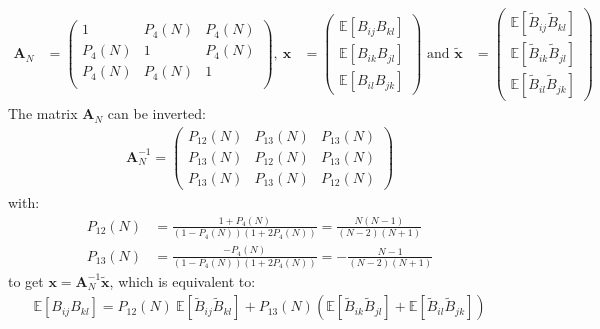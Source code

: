 \documentclass[12pt]{scrartcl}
\begin{document}
\begin{align}
\mathbf{A}_N & = \left( \begin{array}{ccc}
1 & P_4(N) & P_4(N) \\
P_4(N) & 1 & P_4(N) \\
P_4(N) & P_4(N) & 1 \\
\end{array} \right) , \ 
\mathbf{x} & = \left( \begin{array}{c}
\mathbb{E} \left[B_{ij} B_{kl}\right] \\
\mathbb{E} \left[B_{ik} B_{jl}\right] \\
\mathbb{E} \left[B_{il} B_{jk}\right]
\end{array} \right) \text{ and }
\widetilde{\mathbf{x}} & = \left( \begin{array}{c}
\mathbb{E} \left[\widetilde{B}_{ij} \widetilde{B}_{kl}\right] \\
\mathbb{E} \left[\widetilde{B}_{ik} \widetilde{B}_{jl}\right] \\
\mathbb{E} \left[\widetilde{B}_{il} \widetilde{B}_{jk}\right]
\end{array} \right) \nonumber
\end{align}
The matrix $\mathbf{A}_N$ can be inverted:
\begin{align}
\label{eq:invert_lin_sys_gau}
\mathbf{A}_N^{-1} = \left( \begin{array}{ccc}
P_{12}(N) & P_{13}(N) & P_{13}(N) \\
P_{13}(N) & P_{12}(N) & P_{13}(N) \\
P_{13}(N) & P_{13}(N) & P_{12}(N)
\end{array} \right)
\end{align}
with:
\begin{subequations}
\begin{align}
P_{12}(N) & = \frac{1 + P_4(N)}{\left(1 - P_4(N)\right)\left(1 + 2P_4(N)\right)} = \frac{N(N-1)}{(N-2)(N+1)} \\
P_{13}(N) & = \frac{-P_4(N)}{\left(1 - P_4(N)\right)\left(1 + 2P_4(N)\right)} = -\frac{N-1}{(N-2)(N+1)}
\end{align}
\end{subequations}
to get $\mathbf{x} = \mathbf{A}_N^{-1} \widetilde{\mathbf{x}}$, which is equivalent to:
\begin{align}
\label{eq:prod_asy_cov_gau}
\mathbb{E} \left[B_{ij} B_{kl}\right] = P_{12}(N) \ \mathbb{E} \left[\widetilde{B}_{ij} \widetilde{B}_{kl}\right] + P_{13}(N) \left(\mathbb{E} \left[\widetilde{B}_{ik} \widetilde{B}_{jl}\right] + \mathbb{E} \left[\widetilde{B}_{il} \widetilde{B}_{jk}\right]\right)
\end{align}
\end{document}
